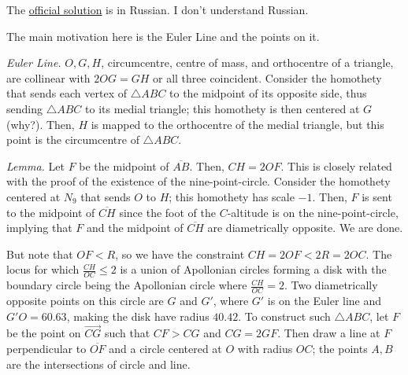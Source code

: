 \begin{solution}\hfil\medskip
	
    The \href{https://geometry.ru/olimp/2007/zaochsol.pdf}{official solution} is in Russian. I don't understand Russian. \medskip

    The main motivation here is the Euler Line and the points on it. 

    \textit{Euler Line.} $O, G, H$, circumcentre, centre of mass, and orthocentre of a triangle, are collinear with $2OG = GH$ or all three coincident. 
    Consider the homothety that sends each vertex of $\triangle ABC$ to the midpoint of its opposite side, thus sending $\triangle ABC$ to its 
    medial triangle; this homothety is then centered at $G$ (why?). Then, $H$ is mapped to the orthocentre of the medial triangle, but this point is
    the circumcentre of $\triangle ABC$. \medskip

    \textit{Lemma.} Let $F$ be the midpoint of $\overline{AB}$. Then, $CH = 2OF$. This is closely related with the proof of the existence of the nine-point-circle.
    Consider the homothety centered at $N_9$ that sends $O$ to $H$; this homothety has scale $-1$. Then, $F$ is sent to the midpoint of $\overline{CH}$ since the foot
    of the $C$-altitude is on the nine-point-circle, implying that $F$ and the midpoint of $\overline{CH}$ are diametrically opposite. We are done. \medskip

    But note that $OF < R$, so we have the constraint $CH = 2OF < 2R = 2OC$. The locus for which $\frac{CH}{OC} \leq 2$ is a union of Apollonian circles forming 
    a disk with the boundary circle being the Apollonian circle where $\frac{CH}{OC} = 2$. Two diametrically opposite points on this circle are $G$ and $G'$, where
    $G'$ is on the Euler line and $G'O = 60.63$, making the disk have radius $40.42$. To construct such $\triangle ABC$, let $F$ be the point on $\overrightarrow{CG}$ such that
    $CF > CG$ and $CG = 2GF.$ Then draw a line at $F$ perpendicular to $\overline{OF}$ and a circle centered at $O$ with radius $OC$; the points $A, B$ are the 
    intersections of circle and line. \medskip


\end{solution}
